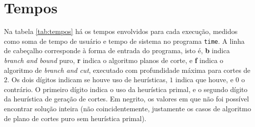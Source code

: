 \documentclass[11pt]{article}
\begin{document}
\section{Tempos}

Na tabela \ref{tab:tempos} há os tempos envolvidos para cada execução,
medidos como soma de tempo de usuário e tempo de sistema no programa
\texttt{time}. A linha de cabeçalho corresponde à forma de entrada do
programa, isto é, \textbf{b} indica \emph{branch and bound} puro,
\textbf{r} indica o algoritmo planos de corte, e \textbf{f} indica o
algoritmo de \emph{branch and cut}, executado com profundidade máxima
para cortes de $2$. Os dois dígitos indicam se houve uso
de heurísticas, $1$ indica que houve, e $0$ o contrário. O primeiro
dígito indica o uso da heurística primal,  e o segundo dígito da
heurística de geração de cortes. Em negrito, os valores em que não foi
possível encontrar solução inteira (não coincidentemente, justamente os
casos de algoritmo de plano de cortes puro sem heurística primal).
\end{document}
